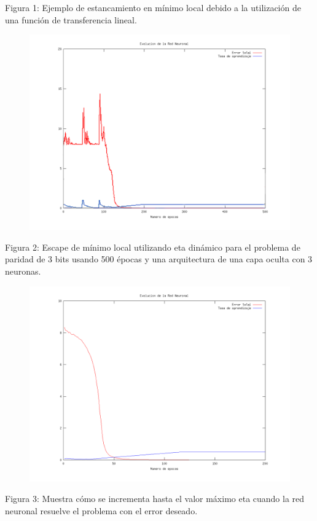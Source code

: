 \documentclass[%
    final,
    reprint,
    notitlepage,
    narroweqnarray,
    inline,
    twoside,
    invited
    ]{ieee}
\begin{document}
\begin{center}
\par Figura 1: Ejemplo de estancamiento en mínimo local debido a la utilización de una función de transferencia lineal.
\end{center}

\begin{figure}[H]
\begin{center}
\includegraphics[scale=0.30]{./images/escapeminlocal.png}
\label{modelado}
\end{center}
\end{figure}

\begin{center}
\par Figura 2: Escape de mínimo local utilizando eta dinámico para el problema de paridad de 3 bits usando 500 épocas y una arquitectura de una capa oculta con 3 neuronas.
\end{center}

\clearpage

\begin{figure}[H]
\begin{center}
\includegraphics[scale=0.30]{./images/incremento.png}
\label{modelado}
\end{center}
\end{figure}

\begin{center}
\par Figura 3: Muestra cómo se incrementa hasta el valor máximo eta cuando la red neuronal resuelve el problema con el error deseado.
\end{center}




\end{document}
